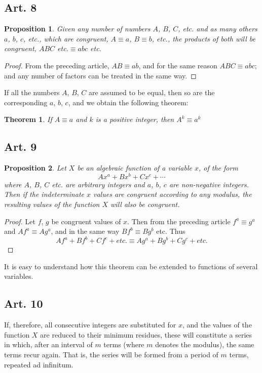 \documentclass{book}
\theoremstyle{plain}
\newtheorem{theorem}{Theorem}
\newtheorem{proposition}{Proposition}
\theoremstyle{remark}
\begin{document}
\subsection*{Art. 8} 

\begin{proposition} Given any number of numbers $A$, $B$, $C$, etc. and as many others $a$, $b$, $c$, etc., which are congruent, $A \equiv a$, $B \equiv b$, etc., the products of both will be congruent, $ABC$ etc.$\equiv abc$ etc.\end{proposition}
\begin{proof} From the preceding article, $AB \equiv ab$, and for the same reason $ABC \equiv abc$; and any number of factors can be treated in the same way.\end{proof}

If all the numbers $A$, $B$, $C$ are assumed to be equal, then so are the corresponding $a$, $b$, $c$, and we obtain the following theorem: 
\begin{theorem} If $A \equiv a$ and $k$ is a positive integer, then $A^k \equiv a^k$ \end{theorem}

\subsection*{Art. 9} 
\begin{proposition} Let $X$ be an algebraic function of a variable $x$, of the form
\[ A x^a + B x^b + C x^c + \cdots \]
where $A$, $B$, $C$ etc. are arbitrary integers and $a$, $b$, $c$ are non-negative integers.  Then if the indeterminate $x$ values are congruent according to any modulus, the resulting values of the function $X$ will also be congruent. \end{proposition}
\begin{proof} Let $f$, $g$ be congruent values of $x$.  Then from the preceding article $f^a \equiv g^a$ and $Af^a \equiv Ag^a$, and in the same way $Bf^b \equiv Bg^b$ etc.  Thus 
\[ Af^a + Bf^b + Cf^c + \textit{etc}. \equiv Ag^a + Bg^b + Cg^c + \textit{etc}. \]
\end{proof}
It is easy to understand how this theorem can be extended to functions of several variables.

\subsection*{Art. 10}

If, therefore, all consecutive integers are substituted for $x$, and the values of the function $X$ are reduced to their minimum residues, these will constitute a series in which, after an interval of $m$ terms (where $m$ denotes the modulus), the same terms recur again.  That is, the series will be formed from a period of $m$ terms, repeated ad infinitum. 
\end{document}
